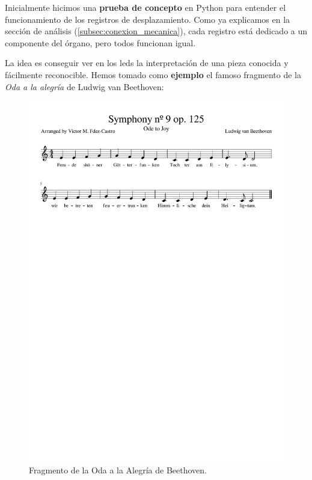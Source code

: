 Inicialmente hicimos una \textbf{prueba de concepto} en Python para entender el funcionamiento de los registros de desplazamiento. Como ya explicamos en la sección de análisis (\ref{subsec:conexion_mecanica}), cada registro está dedicado a un componente del órgano, pero todos funcionan igual.

La idea es conseguir ver en los \acrshort{led}s la interpretación de una pieza conocida y fácilmente reconocible. Hemos tomado como \textbf{ejemplo} el famoso fragmento de la \textit{Oda a la alegría} de Ludwig van Beethoven:

\smallskip

\begin{figure}[H]
	\noindent \begin{centering}
		\includegraphics[clip=true,trim=20 580 20 30,width=\linewidth]{capitulo5/beethoven_1voz}
		\par\end{centering}
	\smallskip
	\caption{\label{fig:beethoven_1voz} Fragmento de la Oda a la Alegría de Beethoven.}
\end{figure}

